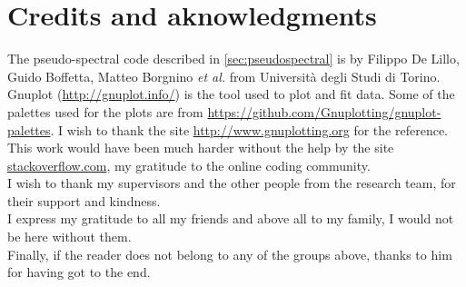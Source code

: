 \section*{Credits and aknowledgments}

The pseudo-spectral code described in \autoref{sec:pseudospectral} is by Filippo De Lillo, Guido Boffetta, Matteo Borgnino \textit{et al.} from Università degli Studi di Torino. \\
Gnuplot (\url{http://gnuplot.info/}) is the tool used to plot and fit data. Some of the palettes used for the plots are from \url{https://github.com/Gnuplotting/gnuplot-palettes}. I wish to thank the site \url{http://www.gnuplotting.org} for the reference. \\
This work would have been much harder without the help by the site \url{stackoverflow.com}, my gratitude to the online coding community. \\
I wish to thank my supervisors and the other people from the research team, for their support and kindness.\\
I express my gratitude to all my friends and above all to my family, I would not be here without them.\\
Finally, if the reader does not belong to any of the groups above, thanks to him for having got to the end.